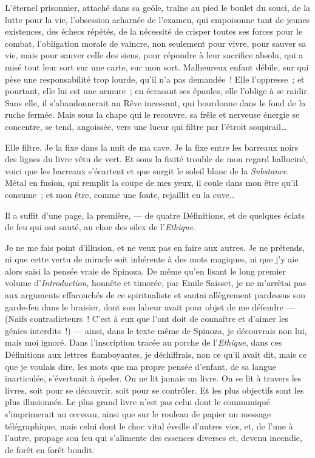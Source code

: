L'éternel prisonnier, attaché dans sa geôle, traîne au pied le boulet du
souci, de la lutte pour la vie, l'obsession acharnée de l'examen, qui
empoisonne tant de jeunes existences, des échecs répétés, de la
nécessité de crisper toutes ses forces pour le combat, l'obligation
morale de vaincre, non seulement pour vivre, pour sauver sa vie, mais
pour sauver celle des siens, pour répondre à leur sacrifice absolu, qui
a misé tout leur sort sur une carte, sur mon sort. Malheureux enfant
débile, sur qui pèse une responsabilité trop lourde, qu'il n'a pas
demandée~! Elle l'oppresse~; et pourtant, elle lui est une armure~; en
écrasant ses épaules, elle l'oblige à se raidir. Sans elle, il
s'abandonnerait au Rêve incessant, qui bourdonne dans le fond de la
ruche fermée. Mais sous la chape qui le recouvre, sa frêle et nerveuse
énergie se concentre, se tend, angoissée, vers une lueur qui filtre par
l'étroit soupirail\ldots{}

\pagebreak

Elle filtre. Je la fixe dans la nuit de ma cave. Je la fixe entre les
barreaux noirs des lignes du livre vêtu de vert. Et sous la fixité
trouble de mon regard halluciné, voici que les barreaux s'écartent et
que surgit le soleil blanc de la \emph{Substance}. Métal en fusion, qui
remplit la coupe de mes yeux, il coule dans mon être qu'il consume~; et
mon être, comme une fonte, rejaillit en la cuve\ldots{}

Il a suffit d'une page, la première, --- de quatre Définitions, et de
quelques éclats de feu qui ont sauté, au choc des silex de
l'\emph{Ethique}.

Je ne me fais point d'illusion, et ne veux pas en faire aux autres. Je
ne prétends, ni que cette vertu de miracle soit inhérente à des mots
magiques, ni que j'y aie alors saisi la pensée vraie de Spinoza. De même
qu'en lisant le long premier volume d'\emph{Introduction}, honnête et
timorée, par Emile Saisset, je ne m'arrêtai pas aux arguments
effarouchés de ce spiritualiste et sautai allègrement pardessus son
garde-feu dans le braisier, dont son labeur avait pour objet de me
défendre --- (Naïfs contradicteurs~! C'est à eux que l'ont doit de
connaître et d'aimer les génies interdits~!) --- ainsi, dans le texte
même de Spinoza, je découvrais non lui, mais moi ignoré. Dans
l'inscription tracée au porche de l'\emph{Ethique}, dans ces Définitions
aux lettres\est\ flamboyantes, je déchiffrais, non ce qu'il avait dit, mais
ce que je voulais dire, les mots que ma propre pensée d'enfant, de sa
langue inarticulée, s'évertuait à épeler. On ne lit jamais un livre. On
se lit à travers les livres, soit pour se découvrir, soit pour se
contrôler. Et les plus objectifs sont les plus illusionnés. Le plus
grand livre n'est pas celui dont le communiqué s'imprimerait au cerveau,
ainsi que sur le rouleau de papier un message télégraphique, mais celui
dont le choc vital éveille d'autres vies, et, de l'une à l'autre,
propage son feu qui s'alimente des essences diverses et, devenu
incendie, de forêt en forêt bondit.

